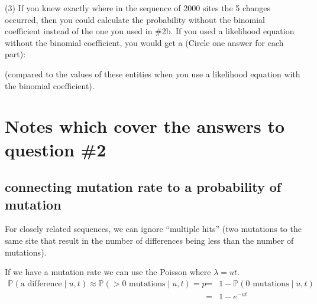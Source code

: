 \documentclass[11pt]{article}
\renewcommand{\Pr}{\mathbb{P}}
\begin{document}
(3) If you knew exactly where in the sequence of 2000 sites the 5 changes occurred, then
you could calculate the probability without the binomial coefficient instead of the one
you used in \#2b.
If you used a likelihood equation without the binomial coefficient, you would get a 
(Circle one answer for each part):
(compared to the values of these entities when you use a likelihood equation with the 
binomial coefficient).

\section*{Notes which cover the answers to question \#2}

\subsection*{connecting mutation rate to a probability of mutation}
For closely related sequences, we can ignore ``multiple hits'' (two mutations to the same
site that result in the number of differences being less than the number of mutations).

If we have a mutation rate we can use the Poisson where $\lambda = ut$.
\begin{eqnarray*}
    \Pr(\mbox{a difference} \mid u, t) \approx \Pr(>0 \mbox{ mutations} \mid u, t) = p
    & = & 1 - \Pr(0 \mbox{ mutations} \mid u, t) \\
    & = & 1 - e^{- ut}
\end{eqnarray*}
\end{document}
